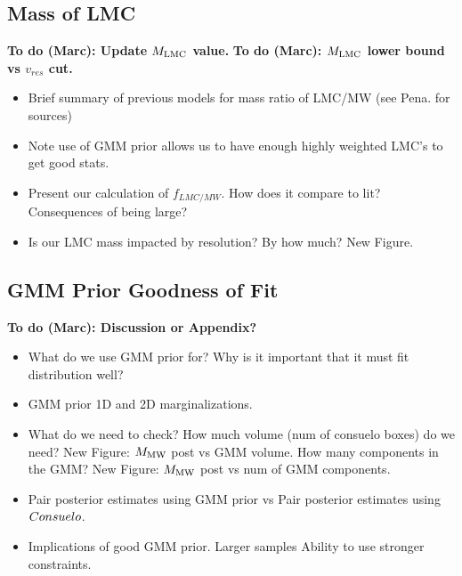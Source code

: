 \documentclass[iop,apj,twocolappendix,numberedappendix]{emulateapj}
\newcommand{\MLMC}{M_{\rm LMC}}
\newcommand{\MMW}{{\rm M}_{\rm MW}}
\newcommand{\consuelo}{{\sc Consuelo }}
\def\MMW{M_{\rm MW}}
\newcommand{\todo}[2]{{\bf To do (#1): #2}}
\begin{document}
\subsection{Mass of LMC}
\label{sec:LMC_discuss}
\todo{Marc}{Update $\MLMC$ value.}
\todo{Marc}{$\MLMC$ lower bound vs $v_{res}$ cut.}
\begin{itemize}
	\item Brief summary of previous models for mass ratio of LMC/MW (see Pena. for sources)
	\item Note use of GMM prior allows us to have enough highly weighted LMC's to get good stats.
	\item Present our calculation of $f_{LMC/MW}$.
		\subitem How does it compare to lit?
		\subitem Consequences of being large?
	\item Is our LMC mass impacted by resolution? By how much?
		\subitem New Figure.
\end{itemize}


\subsection{GMM Prior Goodness of Fit}
\label{sec:gmm_discuss}
\todo{Marc}{Discussion or Appendix?}
\begin{itemize}
	\item What do we use GMM prior for?
		\subitem Why is it important that it must fit distribution well?
	\item GMM prior 1D and 2D marginalizations.
	\item What do we need to check?
		\subitem How much volume (num of consuelo boxes) do we need? New Figure: $\MMW$ post vs GMM volume.
		\subitem How many components in the GMM? New Figure: $\MMW$ post vs num of GMM components.
	\item Pair posterior estimates using GMM prior vs Pair posterior estimates using $\consuelo$.
	\item Implications of good GMM prior.
		\subitem Larger samples
		\subitem Ability to use stronger constraints. 
	
\end{itemize}
\end{document}
